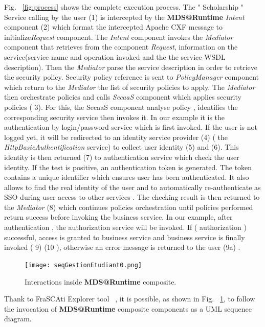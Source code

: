\documentclass[runningheads,a4paper]{llncs}
\begin{document}
Fig. ~\ref{fig:process} shows the complete execution process. The " Scholarship " Service  calling by the user (1) is intercepted by the \textbf{MDS@Runtime} \emph{Intent} component (2) which format the intercepted Apache CXF message to initialize\emph{Request} component. The \emph{Intent} component invokes the \emph{Mediator} component that retrieves from the component \emph{Request}, information on the service(service name and operation invoked and the  the service WSDL description). Then the \emph{Mediator} parse the service description in order to retrieve the security policy. Security policy reference is sent to \emph{PolicyManager} component which return to the \emph{Mediator} the list of security policies to apply. The \emph{Mediator} then orchestrate policies and calls \emph{SecaaS} component which applies security policies ( 3). For this, the SecaaS component analyse  policy , identifies the corresponding security service then invokes it. In our example it is the authentication by login/password service which is first invoked. If the user is not logged yet, it will be redirected to an identity service provider (4) ( the \emph{HttpBasicAuthentification} service) to collect user identity (5) and (6). This identity is then returned (7) to authentication service which check the user identity. If the test is positive, an authentication token is generated. The token contains a unique identifier which ensures user has been authenticated. It also allows to find the real identity of the user and to automatically re-authenticate as SSO during user access to other services . The checking result is then returned to the \emph{Mediator} (8) which continues policies orchestration until policies performed return success before invoking the business service. In our example, after authentication , the authorization service will be invoked. If  ( authorization ) successful, access is granted to business service and business service is finally invoked ( 9) (10 ), otherwise an error message is returned to the user (9a) .
\begin{figure}  
\center
\texttt{[image: seqGestionEtudiant0.png]}
\caption{Interactions inside  \textbf{MDS@Runtime} composite.}
\label{fig:sequence}
\end{figure}


Thank to FraSCAti Explorer tool ~\cite{SMF09}, it is possible, as shown in Fig. ~\ref{fig:sequence}, to follow the invocation of  \textbf{MDS@Runtime} composite components as a UML sequence diagram.
\end{document}
